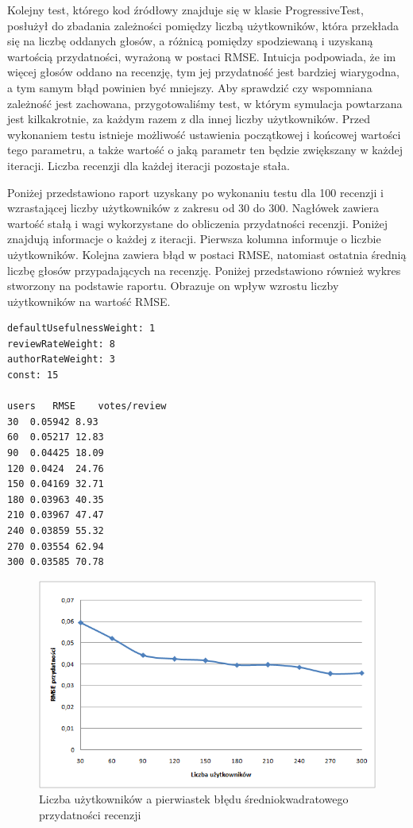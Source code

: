 Kolejny test, którego kod źródłowy znajduje się w klasie ProgressiveTest, posłużył do zbadania zależności pomiędzy liczbą użytkowników, która przekłada się na liczbę oddanych głosów, a różnicą pomiędzy spodziewaną i uzyskaną wartością przydatności, wyrażoną w postaci RMSE. Intuicja podpowiada, że im więcej głosów oddano na recenzję, tym jej przydatność jest bardziej wiarygodna, a tym samym błąd powinien być mniejszy. Aby sprawdzić czy wspomniana zależność jest zachowana, przygotowaliśmy test, w którym symulacja powtarzana jest kilkakrotnie, za każdym razem z dla innej liczby użytkowników. Przed wykonaniem testu istnieje możliwość ustawienia początkowej i końcowej wartości tego parametru, a także wartość o jaką parametr ten będzie zwiększany w każdej iteracji. Liczba recenzji dla każdej iteracji pozostaje stała.


Poniżej przedstawiono raport uzyskany po wykonaniu testu dla 100 recenzji i wzrastającej liczby użytkowników z zakresu od 30 do 300. Nagłówek zawiera wartość stałą i wagi wykorzystane do obliczenia przydatności recenzji. Poniżej znajdują informacje o każdej z iteracji. Pierwsza kolumna informuje o liczbie użytkowników. Kolejna zawiera błąd w postaci RMSE, natomiast ostatnia średnią liczbę głosów przypadających na recenzję. Poniżej przedstawiono również wykres stworzony na podstawie raportu. Obrazuje on wpływ wzrostu liczby użytkowników na wartość RMSE.

\begin{lstlisting}
defaultUsefulnessWeight: 1
reviewRateWeight: 8
authorRateWeight: 3
const: 15

users	RMSE	votes/review	
30	0.05942	8.93
60	0.05217	12.83
90	0.04425	18.09
120	0.0424	24.76
150	0.04169	32.71
180	0.03963	40.35
210	0.03967	47.47
240	0.03859	55.32
270	0.03554	62.94
300	0.03585	70.78
\end{lstlisting}

\begin{figure}[h]
	\centering
	\includegraphics[width=\textwidth, keepaspectratio=true]{images/ProgressiveTest.png}
	\caption{Liczba użytkowników a pierwiastek błędu średniokwadratowego przydatności recenzji}
\end{figure}

